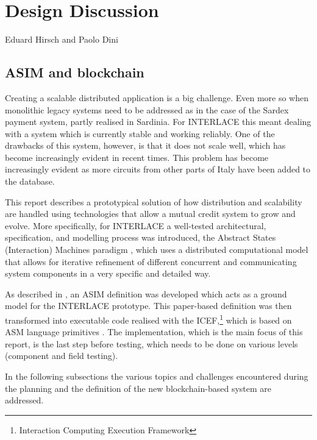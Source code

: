 \chapter{Design Discussion}
\label{ch:design}

\vspace{-1cm}
\begin{center}
Eduard Hirsch and Paolo Dini
\end{center}

\section{ASIM and blockchain}
\label{sec:asim}

Creating a scalable distributed application is a big challenge. Even more so when monolithic legacy systems need to be addressed as in the case of the Sardex payment system, partly realised in Sardinia. For INTERLACE this meant dealing with a system which is currently stable and working reliably. One of the drawbacks of this system, however, is that it does not scale well, which has become increasingly evident in recent times. This problem has become increasingly evident as more circuits from other parts of Italy have been added to the database.

This report describes a prototypical solution of how distribution and scalability are handled using technologies that allow a mutual credit system to grow and evolve. More specifically, for INTERLACE a well-tested architectural, specification, and modelling process was introduced, the Abstract States (Interaction) Machines paradigm \cite{BoergerStaerk2003}, which uses a distributed computational model that allows for iterative refinement of different concurrent and communicating system components in a very specific and detailed way.

As described in \cite{INTERLACE_D21}, an ASIM definition was developed which acts as a ground model for the INTERLACE prototype. This paper-based definition was then transformed into executable code realised with the ICEF,\footnote{Interaction Computing Execution Framework} which is based on ASM language primitives \cite{BoergerStaerk2003}. The implementation, which is the main focus of this report, is the last step before testing, which needs to be done on various levels (component and field testing).

In the following subsections the various topics and challenges encountered during the planning and the definition of the new blockchain-based system are addressed.

